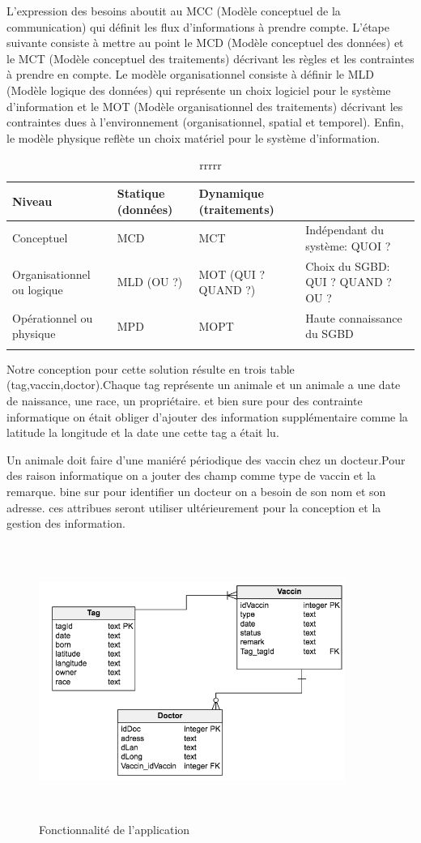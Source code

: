 \documentclass[11pt, a4paper, twoside]{book}
\begin{document}
L'expression des besoins aboutit au MCC (Modèle conceptuel
de la communication) qui définit les flux d'informations à
prendre compte.
L'étape suivante consiste à mettre au point le MCD (Modèle conceptuel des données) et le
MCT (Modèle conceptuel des traitements) décrivant les règles et les contraintes à prendre en
compte.
Le modèle organisationnel consiste à définir le MLD (Modèle logique des données) qui
représente un choix logiciel pour le système d'information et le MOT (Modèle
organisationnel des traitements) décrivant les contraintes dues à l'environnement
(organisationnel, spatial et temporel).
Enfin, le modèle physique reflète un choix matériel pour le système d'information. 


\begin{longtable}{|p{}|p{}|p{}| p{}|}
\hline
\textbf{Niveau } & \textbf{Statique (données) } & \textbf{Dynamique (traitements) } & \\
\hline
Conceptuel  & MCD & MCT  & Indépendant du système: QUOI ? \\
\hline
Organisationnel ou logique  & MLD
(OU ?) & MOT
(QUI ? QUAND ?) & Choix du SGBD:
QUI ? QUAND ? OU ?   \\
\hline
Opérationnel
ou physique  & MPD  & MOPT  & Haute connaissance du
SGBD \\
\hline
\caption{rrrrr}
\end{longtable}

Notre conception pour cette solution résulte en trois table (tag,vaccin,doctor).Chaque tag représente un animale et un animale a une date de naissance, une race, un propriétaire. et bien sure pour des contrainte informatique on était obliger d'ajouter des information supplémentaire comme la latitude la longitude et la date une cette tag a était lu.

Un animale doit faire d'une maniéré périodique des vaccin chez un docteur.Pour des raison informatique on a jouter des champ comme type de vaccin et la remarque. bine sur pour identifier un docteur on a besoin de son nom et son adresse. ces attribues seront utiliser ultérieurement pour la conception et la gestion des information.

\begin{figure}[!h]
\centering
\includegraphics[width=10cm,height=9cm]{ddb}
\caption{Fonctionnalité de l'application}
\end{figure}
\end{document}
